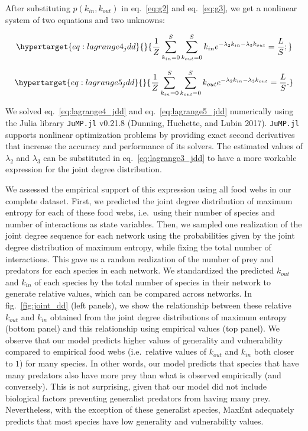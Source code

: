 \documentclass[11pt]{article}
\begin{document}
After substituting \(p(k_{in},k_{out})\) in eq.~\ref{eq:g2} and
eq.~\ref{eq:g3}, we get a nonlinear system of two equations and two
unknowns:

\begin{equation}\protect\hypertarget{eq:lagrange4_jdd}{}{\frac{1}{Z}\sum_{k_{in}=0}^S\sum_{k_{out}=0}^S k_{in} e^{-\lambda_2k_{in}-\lambda_3k_{out}}  = \frac{L}{S};}\label{eq:lagrange4_jdd}\end{equation}

\begin{equation}\protect\hypertarget{eq:lagrange5_jdd}{}{\frac{1}{Z}\sum_{k_{in}=0}^S\sum_{k_{out}=0}^S k_{out} e^{-\lambda_2k_{in}-\lambda_3k_{out}}  = \frac{L}{S}.}\label{eq:lagrange5_jdd}\end{equation}

We solved eq.~\ref{eq:lagrange4_jdd} and eq.~\ref{eq:lagrange5_jdd}
numerically using the Julia library \texttt{JuMP.jl} v0.21.8 (Dunning,
Huchette, and Lubin 2017). \texttt{JuMP.jl} supports nonlinear
optimization problems by providing exact second derivatives that
increase the accuracy and performance of its solvers. The estimated
values of \(\lambda_2\) and \(\lambda_3\) can be substituted in
eq.~\ref{eq:lagrange3_jdd} to have a more workable expression for the
joint degree distribution.

We assessed the empirical support of this expression using all food webs
in our complete dataset. First, we predicted the joint degree
distribution of maximum entropy for each of these food webs, i.e.~using
their number of species and number of interactions as state variables.
Then, we sampled one realization of the joint degree sequence for each
network using the probabilities given by the joint degree distribution
of maximum entropy, while fixing the total number of interactions. This
gave us a random realization of the number of prey and predators for
each species in each network. We standardized the predicted \(k_{out}\)
and \(k_{in}\) of each species by the total number of species in their
network to generate relative values, which can be compared across
networks. In fig.~\ref{fig:joint_dd} (left panels), we show the
relationship between these relative \(k_{out}\) and \(k_{in}\) obtained
from the joint degree distributions of maximum entropy (bottom panel)
and this relationship using empirical values (top panel). We observe
that our model predicts higher values of generality and vulnerability
compared to empirical food webs (i.e.~relative values of \(k_{out}\) and
\(k_{in}\) both closer to \(1\)) for many species. In other words, our
model predicts that species that have many predators also have more prey
than what is observed empirically (and conversely). This is not
surprising, given that our model did not include biological factors
preventing generalist predators from having many prey. Nevertheless,
with the exception of these generalist species, MaxEnt adequately
predicts that most species have low generality and vulnerability values.
\end{document}

